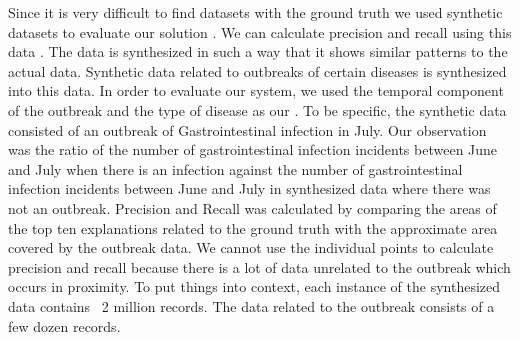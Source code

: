 Since it is very difficult to find datasets with the ground truth we used synthetic datasets to evaluate our solution \cite{maciejewski2009generating}. 
We can calculate precision and recall using this data \cite{powers2011evaluation}. The data is synthesized in such a way that it shows similar patterns to the actual data. Synthetic data related to outbreaks of certain diseases is synthesized into this data. In order to evaluate our system, we used the temporal component of the outbreak and the type of disease as our {\fact}. To be specific, the synthetic data consisted of an outbreak of Gastrointestinal infection in July. Our observation was the ratio of the number of gastrointestinal infection incidents between June and July when there is an infection against the number of gastrointestinal infection incidents between June and July in synthesized data where there was not an outbreak. Precision and Recall was calculated by comparing the areas of the top ten explanations related to the ground truth with the approximate area covered by the outbreak data. We cannot use the individual points to calculate precision and recall because there is a lot of data unrelated to the outbreak which occurs in proximity. To put things into context, each instance of the synthesized data contains ~2 million records. The data related to the outbreak consists of a few dozen records. 


